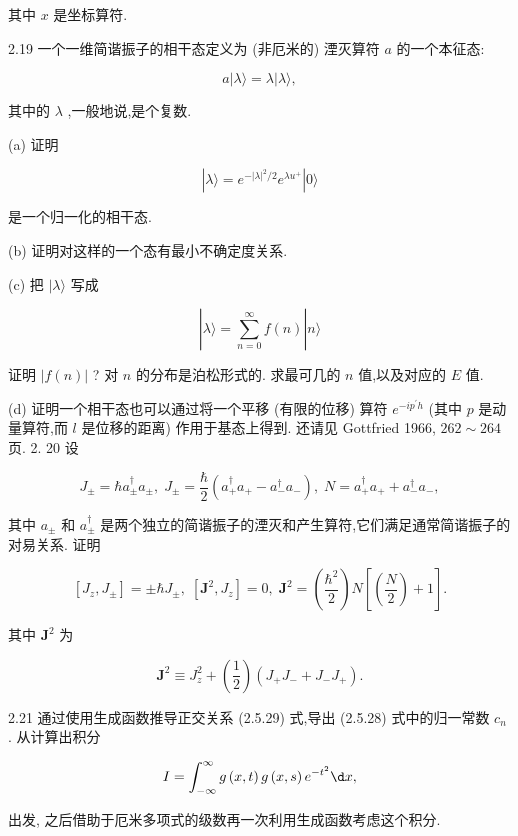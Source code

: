 \documentclass[lang=cn,newtx,10pt,scheme=chinese,thmcnt=section]{elegantbook}
\begin{document}
其中 $x$ 是坐标算符.

2.19 一个一维简谐振子的相干态定义为 (非厄米的) 湮灭算符 $a$ 的一个本征态:

$$
a\left| {\lambda \rangle = \lambda }\right| \lambda \rangle ,
$$

其中的 $\lambda$ ,一般地说,是个复数.

(a) 证明

$$
\left| {\lambda \rangle = {e}^{-{\left| \lambda \right| }^{2}/2}{e}^{\lambda {u}^{ + }}}\right| 0\rangle
$$

是一个归一化的相干态.

(b) 证明对这样的一个态有最小不确定度关系.

(c) 把 $|\lambda \rangle$ 写成

$$
\left| {\lambda \rangle = \mathop{\sum }\limits_{{n = 0}}^{\infty }f\left( n\right) }\right| n\rangle
$$

证明 $\left| {f\left( n\right) }\right|$ ? 对 $n$ 的分布是泊松形式的. 求最可几的 $n$ 值,以及对应的 $E$ 值.

(d) 证明一个相干态也可以通过将一个平移 (有限的位移) 算符 ${e}^{-i{p}^{\prime }h}$ (其中 $p$ 是动量算符,而 $l$ 是位移的距离) 作用于基态上得到. 还请见 Gottfried 1966, ${262} \sim {264}$ 页. 2. 20 设

$$
{J}_{ \pm } = \hbar {a}_{ \pm }^{ \dagger }{a}_{ \pm },\;{J}_{ \pm } = \frac{\hbar }{2}\left( {{a}_{ + }^{ \dagger }{a}_{ + } - {a}_{ - }^{ \dagger }{a}_{ - }}\right) ,\;N = {a}_{ + }^{ \dagger }{a}_{ + } + {a}_{ - }^{ \dagger }{a}_{ - },
$$

其中 ${a}_{ \pm }$ 和 ${a}_{ \pm }^{ \dagger }$ 是两个独立的简谐振子的湮灭和产生算符,它们满足通常简谐振子的对易关系. 证明

$$
\left\lbrack {{J}_{z},{J}_{ \pm }}\right\rbrack = \pm \hbar {J}_{ \pm },\;\left\lbrack {{\mathbf{J}}^{2},{J}_{z}}\right\rbrack = 0,\;{\mathbf{J}}^{2} = \left( \frac{{\hbar }^{2}}{2}\right) N\left\lbrack {\left( \frac{N}{2}\right) + 1}\right\rbrack .
$$

其中 ${\mathbf{J}}^{2}$ 为

$$
{\mathbf{J}}^{2} \equiv {J}_{z}^{2} + \left( \frac{1}{2}\right) \left( {{J}_{ + }{J}_{ - } + {J}_{ - }{J}_{ + }}\right) .
$$

2.21 通过使用生成函数推导正交关系 (2.5.29) 式,导出 (2.5.28) 式中的归一常数 ${c}_{n}$ . 从计算出积分

$$
I = \int_{-\infty }^{\infty }g\left( {x, t}\right) g\left( {x, s}\right) {e}^{-{t}^{2}}{\d x},
$$

出发, 之后借助于厄米多项式的级数再一次利用生成函数考虑这个积分.
\end{document}
